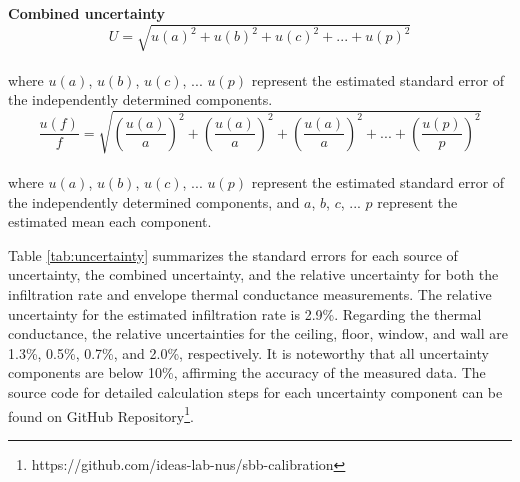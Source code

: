 \documentclass[3p,times,12pt]{elsarticle}
\begin{document}
\begin{sloppypar}
\begin{enumerate}
\textbf{Combined uncertainty} 
\begin{equation}
\label{eq:uncertainty_combo1}
U=\sqrt{u(a)^2+u(b)^2+u(c)^2+...+u(p)^2}
\end{equation} \\
where $u(a)$, $u(b)$, $u(c)$, ... $u(p)$ represent the estimated standard error of the independently determined components. \\

\begin{equation}
\label{eq:uncertainty_combo2}
\frac{u(f)}{f}=\sqrt{(\frac{u(a)}{a})^2+(\frac{u(a)}{a})^2+(\frac{u(a)}{a})^2+...+(\frac{u(p)}{p})^2}
\end{equation} \\
where $u(a)$, $u(b)$, $u(c)$, ... $u(p)$ represent the estimated standard error of the independently determined components, and $a$, $b$, $c$, ... $p$ represent the estimated mean each component.
\end{enumerate}

Table \ref{tab:uncertainty} summarizes the standard errors for each source of uncertainty, the combined uncertainty, and the relative uncertainty for both the infiltration rate and envelope thermal conductance measurements. The relative uncertainty for the estimated infiltration rate is 2.9\%. Regarding the thermal conductance, the relative uncertainties for the ceiling, floor, window, and wall are 1.3\%, 0.5\%, 0.7\%, and 2.0\%, respectively. It is noteworthy that all uncertainty components are below 10\%, affirming the accuracy of the measured data. The source code for detailed calculation steps for each uncertainty component can be found on GitHub Repository\footnote{https://github.com/ideas-lab-nus/sbb-calibration}.


\end{sloppypar}
\end{document}
